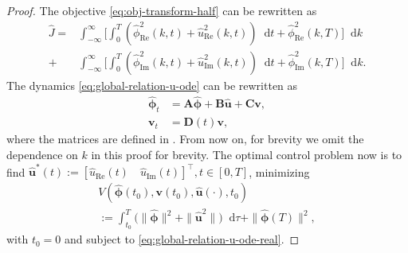 \documentclass[journal,twoside,web]{ieeecolor}
\newcommand{\state}{\phi}
\newcommand{\statehat}{\hat{\state}}
\newcommand*\diff{\mathop{}\!\mathrm{d}}
\begin{document}
\begin{proof}
	The objective \eqref{eq:obj-transform-half} can be rewritten as
	\begin{align*}
		\hat{J}= & \int_{-\infty}^{\infty}\Big[\int_0^T\left( \statehat_{\text{Re}}^2(k,t) + \hat{u}_{\text{Re}}^2(k,t)\right)\diff t + \statehat_{\text{Re}}^2(k,T)\Big]\diff k \\
		+ &\int_{-\infty}^{\infty}\Big[\int_0^T\left( \statehat_{\text{Im}}^2(k,t) + \hat{u}_{\text{Im}}^2(k,t)\right)\diff t + \statehat_{\text{Im}}^2(k,T)\Big]\diff k.
	\end{align*}
	The dynamics \eqref{eq:global-relation-u-ode} can be rewritten as
	\begin{equation} \label{eq:global-relation-u-ode-real}
		\begin{aligned}
				\boldsymbol{\statehat}_t&=\mathbf{A}\boldsymbol{\statehat}+\mathbf{B}\boldsymbol{\hat{u}}+\mathbf{C}\boldsymbol{v},\\
				\boldsymbol{v}_t&=\mathbf{D}(t)\boldsymbol{v},
		\end{aligned}
	\end{equation}
	where the matrices are defined in .
	From now on, for brevity we omit the dependence on $k$ in this proof for brevity.
	The optimal control problem now is to find $\boldsymbol{\hat{u}}^*(t):= [\hat{u}_{\text{Re}}(t)\quad \hat{u}_{\text{Im}}(t)]^\top, t\in[0,T]$, minimizing 
	\begin{multline*}
		V(\boldsymbol{\statehat}(t_0),\boldsymbol{v}(t_0),\boldsymbol{\hat{u}}(\cdot), t_0)\\
		:=\int_{t_0}^T\big( \|\boldsymbol{\statehat}\|^2+\|\boldsymbol{\hat{u}}^2\|\big)\diff\tau + \|\boldsymbol{\statehat}(T)\|^2,
	\end{multline*}
	with $t_0=0$ and 
	subject to \eqref{eq:global-relation-u-ode-real}.
	

\end{proof}
\end{document}
